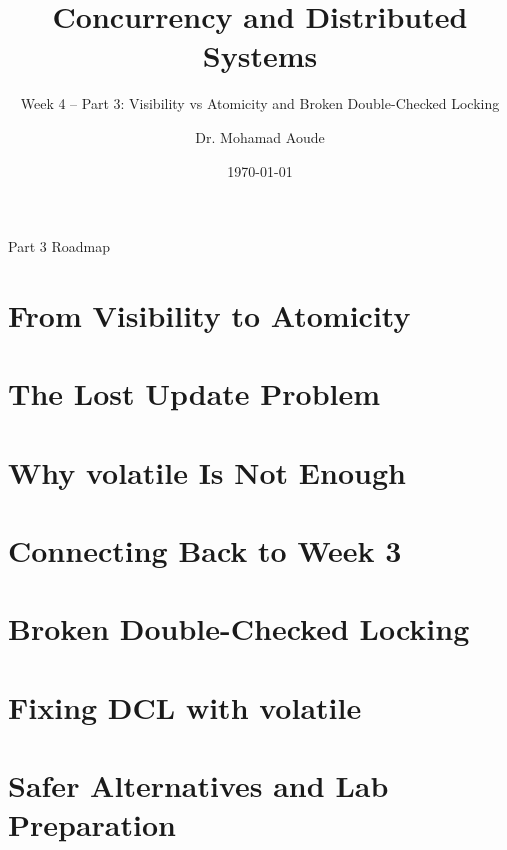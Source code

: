 \documentclass[aspectratio=169,11pt]{beamer}
\title[Week 4 -- Part 3]{Concurrency and Distributed Systems}
\subtitle{Week 4 -- Part 3: Visibility vs Atomicity and Broken Double-Checked Locking}
\author{Dr. Mohamad Aoude}
\institute{Faculty of Engineering}
\date{\today}
\begin{document}
	
	\begin{frame}
		\titlepage
	\end{frame}
	
	\begin{frame}{Part 3 Roadmap}
		\tableofcontents
	\end{frame}
	
	\section{From Visibility to Atomicity}
	\section{The Lost Update Problem}
	\section{Why volatile Is Not Enough}
	\section{Connecting Back to Week 3}
	\section{Broken Double-Checked Locking}
	\section{Fixing DCL with volatile}
	\section{Safer Alternatives and Lab Preparation}
	
\end{document}
